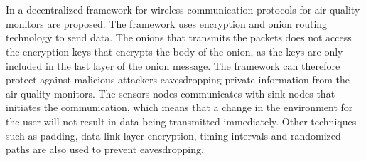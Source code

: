 \\\\
In \cite{PrivacyAndFrameworkDecentAQM} a decentralized framework for wireless communication protocols for air quality monitors are proposed. The framework uses encryption and onion routing technology to send data. The onions that transmits the packets does not access the encryption keys that encrypts the body of the onion, as the keys are only included in the last layer of the onion message. The framework can therefore protect against malicious attackers eavesdropping private information from the air quality monitors. The sensors nodes communicates with sink nodes that initiates the communication, which means that a change in the environment for the user will not result in data being transmitted immediately. Other techniques such as padding, data-link-layer encryption, timing intervals and randomized paths are also used to prevent eavesdropping. 
\\\\
